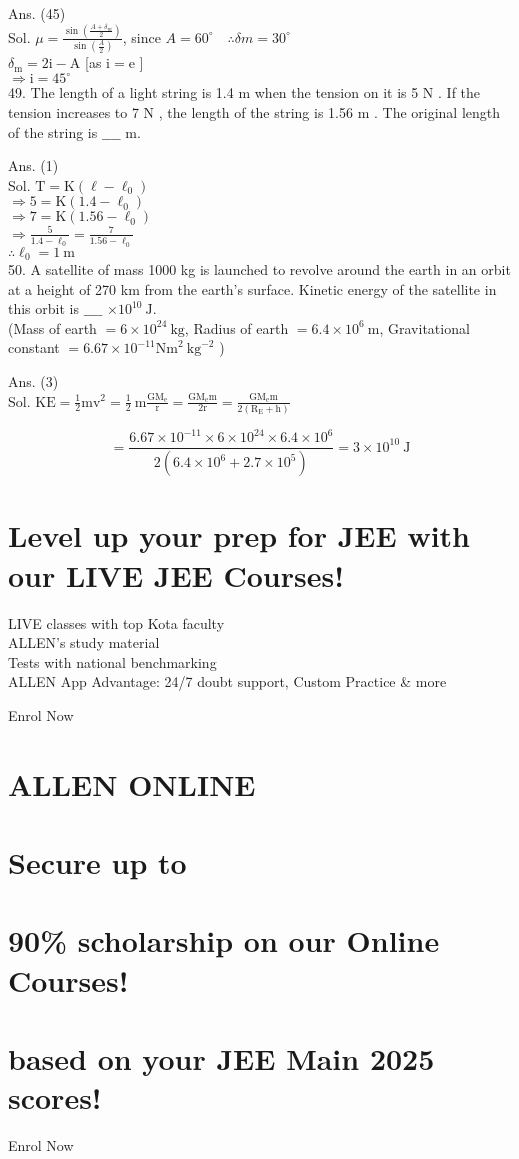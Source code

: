 \documentclass[10pt]{article}
\begin{document}
Ans. (45)\\
Sol. \(\mu=\frac{\sin \left(\frac{A+\delta_{m}}{2}\right)}{\sin \left(\frac{A}{2}\right)}\), since \(A=60^{\circ} \quad \therefore \delta m=30^{\circ}\)\\
\(\delta_{\mathrm{m}}=2 \mathrm{i}-\mathrm{A}\) [as \(\mathrm{i}=\mathrm{e}\) ]\\
\(\Rightarrow \mathrm{i}=45^{\circ}\)\\
49. The length of a light string is 1.4 m when the tension on it is 5 N . If the tension increases to 7 N , the length of the string is 1.56 m . The original length of the string is \(\_\_\_\_\) m.

Ans. (1)\\
Sol. \(\mathrm{T}=\mathrm{K}\left(\ell-\ell_{0}\right)\)\\
\(\Rightarrow 5=\mathrm{K}\left(1.4-\ell_{0}\right)\)\\
\(\Rightarrow 7=\mathrm{K}\left(1.56-\ell_{0}\right)\)\\
\(\Rightarrow \frac{5}{1.4-\ell_{0}}=\frac{7}{1.56-\ell_{0}}\)\\
\(\therefore \ell_{0}=1 \mathrm{~m}\)\\
50. A satellite of mass 1000 kg is launched to revolve around the earth in an orbit at a height of 270 km from the earth's surface. Kinetic energy of the satellite in this orbit is \(\_\_\_\_\) \(\times 10^{10} \mathrm{~J}\).\\
(Mass of earth \(=6 \times 10^{24} \mathrm{~kg}\), Radius of earth \(= 6.4 \times 10^{6} \mathrm{~m}\), Gravitational constant \(= 6.67 \times 10^{-11} \mathrm{Nm}^{2} \mathrm{~kg}^{-2}\) )

Ans. (3)\\
Sol. \(\mathrm{KE}=\frac{1}{2} \mathrm{mv}^{2}=\frac{1}{2} \mathrm{~m} \frac{\mathrm{GM}_{\mathrm{e}}}{\mathrm{r}}=\frac{\mathrm{GM}_{\mathrm{e}} \mathrm{m}}{2 \mathrm{r}}=\frac{\mathrm{GM}_{\mathrm{e}} \mathrm{m}}{2\left(\mathrm{R}_{\mathrm{E}}+\mathrm{h}\right)}\)

\[
=\frac{6.67 \times 10^{-11} \times 6 \times 10^{24} \times 6.4 \times 10^{6}}{2\left(6.4 \times 10^{6}+2.7 \times 10^{5}\right)}=3 \times 10^{10} \mathrm{~J}
\]

\section*{Level up your prep for JEE with our LIVE JEE Courses!}
LIVE classes with top Kota faculty\\
ALLEN's study material\\
Tests with national benchmarking\\
ALLEN App Advantage: 24/7 doubt support, Custom Practice \& more

Enrol Now

\section*{ALLEN ONLINE}
\section*{Secure up to}
\section*{90\% scholarship on our Online Courses!}
\section*{based on your JEE Main 2025 scores!}
Enrol Now
\end{document}
